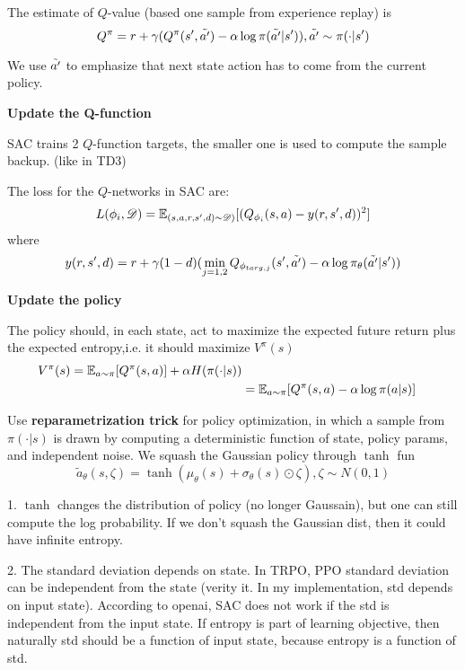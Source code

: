 \documentclass{article}
\begin{document}
The estimate of $Q$-value (based one sample from experience replay) is
\[
    Q^{\pi} = r + \gamma(Q^{\pi}(s^{\prime}, \tilde {a^{\prime}}) 
    - \alpha \log \pi(\tilde {a^{\prime}} | s^{\prime})), 
    \tilde {a^{\prime}} \sim \pi(\cdot | s^{\prime})
\]

We use $\tilde {a^{\prime}}$ to emphasize that next state action has to come
from the current policy. 

\textbf{Update the Q-function}

SAC trains 2 $Q$-function targets, the smaller one is used to compute
the sample backup. (like in TD3)

The loss for the $Q$-networks in SAC are:
\[
    L(\phi_i, \mathscr{D}) = \mathbb{E}_{(s,a,r,s^{\prime},d)\sim\mathscr{D})}[
        (Q_{\phi_i}(s,a)-y(r,s^{\prime},d))^2]
\]
where
\[
    y(r,s^{\prime},d)=r + \gamma(1-d)(\min_{j=1,2}
    Q_{\phi_{targ,j}}(s^{\prime}, \tilde {a^{\prime}}) - 
    \alpha \log \pi_{\theta}(\tilde {a^{\prime}} | s^{\prime})
    )
\]

\textbf{Update the policy}

The policy should, in each state, act to maximize the expected future
return plus the expected entropy,i.e. it should maximize $V^{\pi}(s)$
\begin{align*}
    V^{\pi}(s) = \mathbb{E}_{a \sim \pi}[Q^{\pi}(s,a)] + \alpha H(\pi(\cdot|s)) \\
    & = \mathbb{E}_{a \sim\pi}[Q^{\pi}(s,a) - \alpha\log\pi(a|s)]
\end{align*}

Use \textbf{reparametrization trick} for policy optimization, in which
a sample from $\pi(\cdot | s)$  is drawn by computing a deterministic
function of state, policy params, and independent noise. We squash 
the Gaussian policy through $\tanh$ fun
\[
    \tilde a_{\theta}(s,\zeta) = \tanh(\mu_{\theta}(s) + 
    \sigma_{\theta}(s)\odot \zeta), \zeta \sim N(0, 1)
\]

1. $\tanh$ changes the distribution of policy (no longer Gaussain),
but one can still compute the log probability. If we don't squash
the Gaussian dist, then it could have infinite entropy. 

2. The standard deviation depends on state. In TRPO, PPO standard 
deviation can be independent from the state (verity it. In my 
implementation, std depends on input state). 
According to openai, SAC does not work if the std is independent from
the input state. 
If entropy is part of learning objective, then naturally std should be
a function of input state, because entropy is a function of std. 

\end{document}
